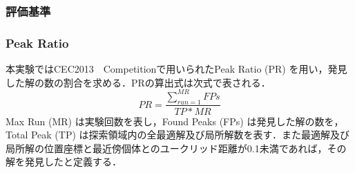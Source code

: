 \documentclass[a4j,11pt]{jarticle}
\begin{document}







\subsubsection{評価基準}
\label{sss:DNRBA-eval}

\subsubsection{Peak Ratio}
本実験ではCEC2013　Competitionで用いられたPeak Ratio (PR) \cite{CEC2013} を用い，発見した解の数の割合を求める．PRの算出式は次式で表される．
\begin{equation}
PR=\frac{\sum_{run=1}^{MR}FPs}{TP*MR}
\end{equation}
Max Run (MR) は実験回数を表し，Found Peaks (FPs) は発見した解の数を，Total Peak (TP) は探索領域内の全最適解及び局所解数を表す．また最適解及び局所解の位置座標と最近傍個体とのユークリッド距離が0.1未満であれば，その解を発見したと定義する．
\end{document}
